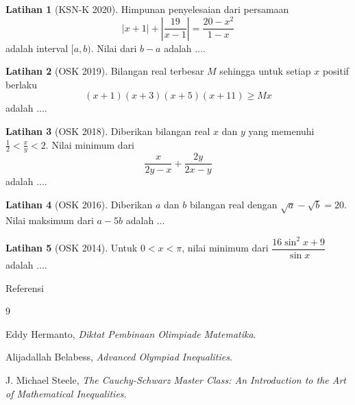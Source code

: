 \documentclass[aspectratio=169]{beamer}
\theoremstyle{definition}
\newtheorem{latihan}{Latihan}
\begin{document}
\begin{frame}{\insertsection}
  \begin{latihan}[KSN-K 2020]
    Himpunan penyelesaian dari persamaan
    \[
      |x+1|+\left|\frac{19}{x-1}\right|=\frac{20-x^2}{1-x}
    \]
    adalah interval \([a,b)\). Nilai dari \(b-a\) adalah \(\ldots\).
  \end{latihan}
  \begin{latihan}[OSK 2019]
    Bilangan real terbesar \(M\) sehingga untuk setiap \(x\) positif berlaku
    \[
      (x+1)(x+3)(x+5)(x+11)\geq Mx
    \]
    adalah \(\ldots\).
  \end{latihan}
\end{frame}

\begin{frame}{\insertsection}
  \begin{latihan}[OSK 2018]
    Diberikan bilangan real \(x\) dan \(y\) yang memenuhi
    $
      \frac{1}{2}<\frac{x}{y}<2.
    $
    Nilai minimum dari
    \[
      \frac{x}{2y-x}+\frac{2y}{2x-y}
    \]
    adalah \(\ldots\).
  \end{latihan}
  \begin{latihan}[OSK 2016]
    Diberikan \(a\) dan \(b\) bilangan real dengan
    $
      \sqrt{a}-\sqrt{b}=20.
    $
    Nilai maksimum dari \(a-5b\) adalah \(\ldots\)
  \end{latihan}
  \begin{latihan}[OSK 2014]
    Untuk \(0<x<\pi\), nilai minimum dari
    $
      \dfrac{16\sin^2 x+9}{\sin x}
    $
    adalah \(\ldots\).
  \end{latihan}
\end{frame}

\begin{frame}{Referensi}
  \begin{thebibliography}{9}

    Eddy Hermanto,
    \emph{Diktat Pembinaan Olimpiade Matematika}.

    Alijadallah Belabess,
    \emph{Advanced Olympiad Inequalities}.

    J. Michael Steele,
    \emph{The Cauchy-Schwarz Master Class: An Introduction to the Art of Mathematical Inequalities}.

  \end{thebibliography}
\end{frame}
\end{document}
